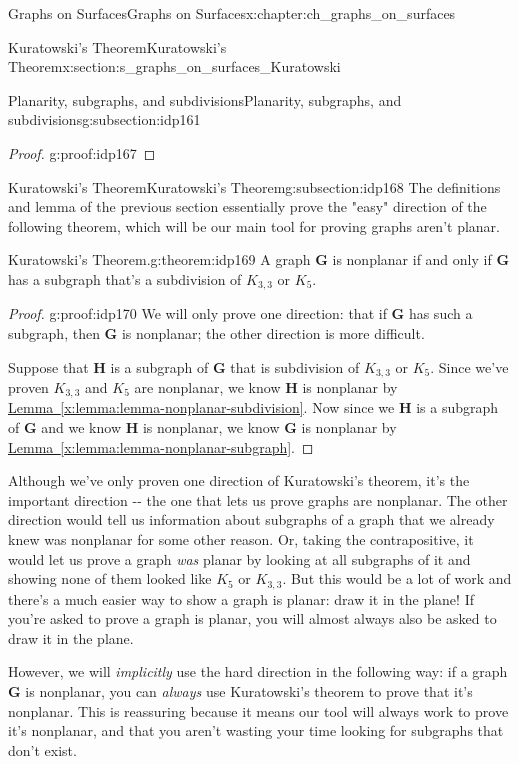 \documentclass[oneside,10pt,]{book}
\newcommand{\xreffont}{\relax}
\numberwithin{equation}{section}
\newcommand{\bfG}{\mathbf{G}}
\newcommand{\bfH}{\mathbf{H}}
\begin{document}
\begin{chapterptx}{Graphs on Surfaces}{}{Graphs on Surfaces}{}{}{x:chapter:ch_graphs_on_surfaces}
\begin{sectionptx}{Kuratowski's Theorem}{}{Kuratowski's Theorem}{}{}{x:section:s_graphs_on_surfaces_Kuratowski}
\begin{subsectionptx}{Planarity, subgraphs, and subdivisions}{}{Planarity, subgraphs, and subdivisions}{}{}{g:subsection:idp161}
\begin{proof}{}{g:proof:idp167}
\end{proof}
\end{subsectionptx}
%
%
\typeout{************************************************}
\typeout{************************************************}
%
\begin{subsectionptx}{Kuratowski's Theorem}{}{Kuratowski's Theorem}{}{}{g:subsection:idp168}
The definitions and lemma of the previous section essentially prove the "easy" direction of the following theorem, which will be our main tool for proving graphs aren't planar.%
\begin{theorem}{Kuratowski's Theorem.}{}{g:theorem:idp169}%
A graph \(\bfG\) is nonplanar if and only if \(\bfG\) has a subgraph that's a subdivision of \(K_{3,3}\) or \(K_5\).%
\end{theorem}
\begin{proof}{}{g:proof:idp170}
We will only prove one direction: that if \(\bfG\) has such a subgraph, then \(\bfG\) is nonplanar; the other direction is more difficult.%
\par
Suppose that \(\bfH\) is a subgraph of \(\bfG\) that is subdivision of \(K_{3,3}\) or \(K_5\).  Since we've proven \(K_{3,3}\) and \(K_5\) are nonplanar, we know \(\bfH\) is nonplanar by \hyperref[x:lemma:lemma-nonplanar-subdivision]{Lemma~{\xreffont\ref{x:lemma:lemma-nonplanar-subdivision}}}.  Now since we \(\bfH\) is a subgraph of \(\bfG\) and we know \(\bfH\) is nonplanar, we know \(\bfG\) is nonplanar by \hyperref[x:lemma:lemma-nonplanar-subgraph]{Lemma~{\xreffont\ref{x:lemma:lemma-nonplanar-subgraph}}}.%
\end{proof}
Although we've only proven one direction of Kuratowski's theorem, it's the important direction -{}-{} the one that lets us prove graphs are nonplanar.  The other direction would tell us information about subgraphs of a graph that we already knew was nonplanar for some other reason.  Or, taking the contrapositive, it would let us prove a graph \emph{was} planar by looking at all subgraphs of it and showing none of them looked like \(K_5\) or \(K_{3,3}\).  But this would be a lot of work and there's a much easier way to show a graph is planar: draw it in the plane! If you're asked to prove a graph is planar, you will almost always also be asked to draw it in the plane.%
\par
However, we will \emph{implicitly} use the hard direction in the following way: if a graph \(\bfG\) is nonplanar, you can \emph{always} use Kuratowski's theorem to prove that it's nonplanar.  This is reassuring because it means our tool will always work to prove it's nonplanar, and that you aren't wasting your time looking for subgraphs that don't exist.%

\end{subsectionptx}
\end{sectionptx}
\end{chapterptx}
\end{document}
